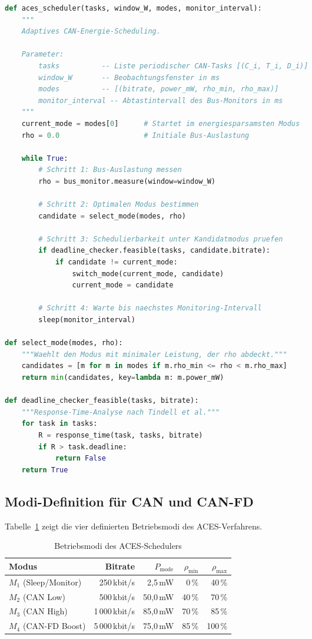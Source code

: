 ﻿\documentclass[a4paper,12pt]{article}
\theoremstyle{definition}
\begin{document}
\begin{lstlisting}[language=Python, caption=ACES -- Adaptiver CAN Energy Scheduler (Pseudocode)]
def aces_scheduler(tasks, window_W, modes, monitor_interval):
    """
    Adaptives CAN-Energie-Scheduling.

    Parameter:
        tasks          -- Liste periodischer CAN-Tasks [(C_i, T_i, D_i)]
        window_W       -- Beobachtungsfenster in ms
        modes          -- [(bitrate, power_mW, rho_min, rho_max)]
        monitor_interval -- Abtastintervall des Bus-Monitors in ms
    """
    current_mode = modes[0]      # Startet im energiesparsamsten Modus
    rho = 0.0                    # Initiale Bus-Auslastung

    while True:
        # Schritt 1: Bus-Auslastung messen
        rho = bus_monitor.measure(window=window_W)

        # Schritt 2: Optimalen Modus bestimmen
        candidate = select_mode(modes, rho)

        # Schritt 3: Schedulierbarkeit unter Kandidatmodus pruefen
        if deadline_checker.feasible(tasks, candidate.bitrate):
            if candidate != current_mode:
                switch_mode(current_mode, candidate)
                current_mode = candidate

        # Schritt 4: Warte bis naechstes Monitoring-Intervall
        sleep(monitor_interval)

def select_mode(modes, rho):
    """Waehlt den Modus mit minimaler Leistung, der rho abdeckt."""
    candidates = [m for m in modes if m.rho_min <= rho < m.rho_max]
    return min(candidates, key=lambda m: m.power_mW)

def deadline_checker_feasible(tasks, bitrate):
    """Response-Time-Analyse nach Tindell et al."""
    for task in tasks:
        R = response_time(task, tasks, bitrate)
        if R > task.deadline:
            return False
    return True
\end{lstlisting}

\subsection{Modi-Definition f\"{u}r CAN und CAN-FD}

Tabelle~\ref{tab:modes} zeigt die vier definierten Betriebsmodi des ACES-Verfahrens.

\begin{table}[H]
\centering
\caption{Betriebsmodi des ACES-Schedulers}
\label{tab:modes}
\begin{tabular}{lrrrr}
\toprule
Modus & Bitrate & $P_{\mathrm{mode}}$ & $\rho_{\min}$ & $\rho_{\max}$ \\
\midrule
$M_1$ (Sleep/Monitor) &   250\,kbit/s &  2,5\,mW & 0\,\%  & 40\,\% \\
$M_2$ (CAN Low)       &   500\,kbit/s & 50,0\,mW & 40\,\% & 70\,\% \\
$M_3$ (CAN High)      & 1\,000\,kbit/s & 85,0\,mW & 70\,\% & 85\,\% \\
$M_4$ (CAN-FD Boost)  & 5\,000\,kbit/s & 75,0\,mW & 85\,\% & 100\,\% \\
\bottomrule
\end{tabular}
\end{table}
\end{document}
